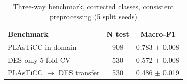 \begin{table}
\centering
\caption{Three-way benchmark, corrected classes, consistent preprocessing (5 split seeds)}
\begin{tabular}{lcc}
\hline
Benchmark & N test & Macro-F1 \\
\hline
PLAsTiCC in-domain & 908 & 0.783 $\pm$ 0.008 \\
DES-only 5-fold CV & 530 & 0.572 $\pm$ 0.008 \\
PLAsTiCC $\rightarrow$ DES transfer & 530 & 0.486 $\pm$ 0.019 \\
\hline
\end{tabular}
\end{table}
